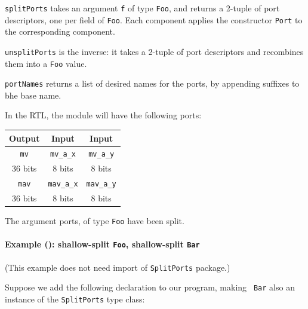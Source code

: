 {\tt splitPorts} takes an argument {\tt f} of type {\tt Foo}, and
returns a 2-tuple of port descriptors, one per field of {\tt Foo}.
Each component applies the constructor {\tt Port} to the corresponding
component.

{\tt unsplitPorts} is the inverse: it takes a 2-tuple of port
descriptors and recombines them into a {\tt Foo} value.

{\tt portNames} returns a list of desired names for the ports, by
appending suffixes to bhe base name.

In the RTL, the module will have the following ports:

\begin{center}
  \begin{tabular}{|c||c|c|}
    \hline
     Output &
     Input  &
     Input  \\
    \hline
     {\tt mv}       &
     {\tt mv\_a\_x} &
     {\tt mv\_a\_y} \\
     36 bits &
      8 bits &
      8 bits \\
    \hline
     {\tt mav}       &
     {\tt mav\_a\_x} &
     {\tt mav\_a\_y} \\
     36 bits &
      8 bits &
      8 bits \\
    \hline
  \end{tabular}
\end{center}

The argument ports, of type {\tt Foo} have been split.


\paragraph{Example (\BSV): shallow-split {\tt Foo}, shallow-split {\tt Bar}}

\label{sec:splitports_examples_BSV_Foo_Shallow_Bar_Shallow}

\hspace*{1em}

{\footnotesize (This example does not need import of {\tt SplitPorts} package.)}

Suppose we add the following declaration to our program, making {\tt
  Bar} also an instance of the {\tt SplitPorts} type class:


